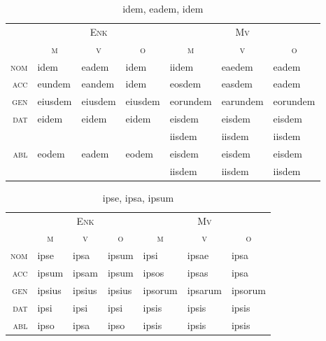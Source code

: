 \documentclass[12pt,a4paper]{article}
\begin{document}
\begin{table}[H]
\centering
\begin{tabular}{ r | l l l | l l l }
\toprule
 & \multicolumn{3}{c|}{\textsc{Enk}} & \multicolumn{3}{c}{\textsc{Mv}} \\
 & \multicolumn{1}{c}{\textsc{m}} & \multicolumn{1}{c}{\textsc{v}} & \multicolumn{1}{c|}{\textsc{o}} & \multicolumn{1}{c}{\textsc{m}} & \multicolumn{1}{c}{\textsc{v}} & \multicolumn{1}{c}{\textsc{o}} \\ 
\midrule
\textsc{nom} & idem    & eadem   & idem    & iidem    & eaedem   & eadem    \\
\textsc{acc} & eundem  & eandem  & idem    & eosdem   & easdem   & eadem    \\
\textsc{gen} & eiusdem & eiusdem & eiusdem & eorundem & earundem & eorundem \\
\multirow{2}{*}{\textsc{dat}} & \multirow{2}{*}{eidem}   & \multirow{2}{*}{eidem}   & \multirow{2}{*}{eidem}   & eisdem   & eisdem   & eisdem   \\
             &         &         &         & iisdem   & iisdem   & iisdem   \\
\multirow{2}{*}{\textsc{abl}} & \multirow{2}{*}{eodem}   & \multirow{2}{*}{eadem}   & \multirow{2}{*}{eodem}   & eisdem   & eisdem   & eisdem   \\
             &         &         &         & iisdem   & iisdem   & iisdem   \\
\bottomrule
\end{tabular}
\caption{idem, eadem, idem}
\label{tab:idem}
\end{table}

\begin{table}[H]
\centering
\begin{tabular}{ r | l l l | l l l }
\toprule
 & \multicolumn{3}{c|}{\textsc{Enk}} & \multicolumn{3}{c}{\textsc{Mv}} \\
 & \multicolumn{1}{c}{\textsc{m}} & \multicolumn{1}{c}{\textsc{v}} & \multicolumn{1}{c|}{\textsc{o}} & \multicolumn{1}{c}{\textsc{m}} & \multicolumn{1}{c}{\textsc{v}} & \multicolumn{1}{c}{\textsc{o}} \\ 
\midrule
\textsc{nom} & ipse   & ipsa   & ipsum  & ipsi    & ipsae   & ipsa    \\
\textsc{acc} & ipsum  & ipsam  & ipsum  & ipsos   & ipsas   & ipsa    \\
\textsc{gen} & ipsius & ipsius & ipsius & ipsorum & ipsarum & ipsorum \\
\textsc{dat} & ipsi   & ipsi   & ipsi   & ipsis   & ipsis   & ipsis   \\
\textsc{abl} & ipso   & ipsa   & ipso   & ipsis   & ipsis   & ipsis   \\
\bottomrule
\end{tabular}
\caption{ipse, ipsa, ipsum}
\label{tab:ipse}
\end{table}
\end{document}
